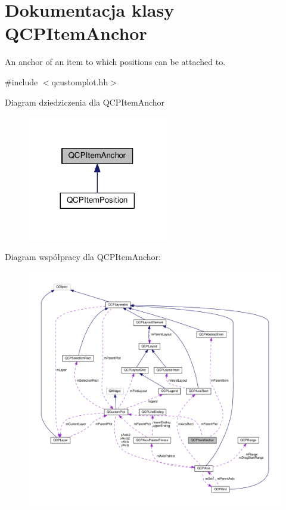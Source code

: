 \hypertarget{class_q_c_p_item_anchor}{}\section{Dokumentacja klasy Q\+C\+P\+Item\+Anchor}
\label{class_q_c_p_item_anchor}


An anchor of an item to which positions can be attached to.  




{\ttfamily \#include $<$qcustomplot.\+hh$>$}



Diagram dziedziczenia dla Q\+C\+P\+Item\+Anchor\nopagebreak
\begin{figure}[H]
\begin{center}
\leavevmode
\includegraphics[width=173pt]{class_q_c_p_item_anchor__inherit__graph}
\end{center}
\end{figure}


Diagram współpracy dla Q\+C\+P\+Item\+Anchor\+:\nopagebreak
\begin{figure}[H]
\begin{center}
\leavevmode
\includegraphics[width=350pt]{class_q_c_p_item_anchor__coll__graph}
\end{center}
\end{figure}
